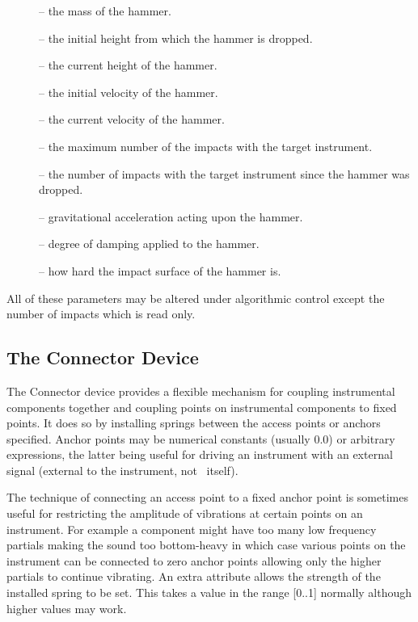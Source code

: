 \begin{description}
\item[] -- the mass of the hammer.
\item[] -- the initial height from which the hammer is dropped.
\item[] -- the current height of the hammer.
\item[] -- the initial velocity of the hammer.
\item[] -- the current velocity of the hammer.
\item[] -- the maximum number of the impacts with the
target instrument.
\item[] -- the number of impacts with the target instrument
since the hammer was dropped.
\item[] -- gravitational acceleration acting upon the hammer.
\item[] -- degree of damping applied to the hammer.
\item[] -- how hard the impact surface of the hammer is.
\end{description}

All of these parameters may be altered under algorithmic control except the
number of impacts which is read only. 

\subsection*{The Connector Device}
\label{section:connector_device}
The Connector device provides a flexible mechanism for coupling 
instrumental components together and coupling points on instrumental 
components to fixed  points. It does so by installing 
springs between the
access points or anchors specified. Anchor points may be numerical constants
(usually 0.0) or arbitrary expressions, the latter being useful for driving
an instrument with an external signal (external to the instrument, not \tao\ 
itself).

The technique of connecting an access point to a fixed anchor point
is sometimes useful for restricting the amplitude of vibrations at certain
points on an instrument. For example a component might have too many low
frequency partials making the sound too bottom-heavy in which case various
points on the instrument can be connected to zero anchor points allowing only
the higher partials to continue vibrating. An extra attribute allows the
strength of the installed spring to be set. This takes a value in the range
[0..1] normally although higher values may work.


